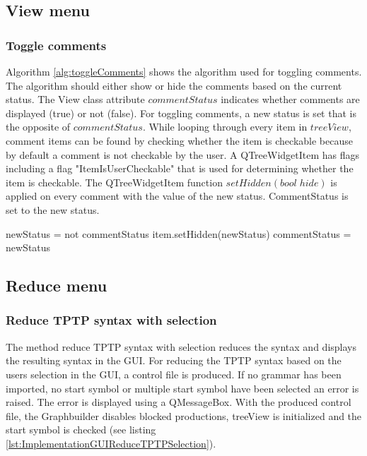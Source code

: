 \subsection{View menu}\label{sec:ImplementationGUIViewMenu}
\subsubsection{Toggle comments}\label{sec:ImplementationGUIToggleComments}

Algorithm \ref{alg:toggleComments} shows the algorithm used for toggling comments. The algorithm should either show or hide the comments based on the current status. 
The View class attribute $commentStatus$ indicates whether comments are displayed (true) or not (false). For toggling comments, a new status is set that is the opposite of $commentStatus$. While looping through every item in $treeView$, comment items can be found by checking whether the item is checkable because by default a comment is not checkable by the user. A QTreeWidgetItem has flags including a flag "ItemIsUserCheckable" that is used for determining whether the item is checkable. The QTreeWidgetItem function $setHidden(bool\;hide)$ is applied on every comment with the value of the new status. CommentStatus is set to the new status. 

\begin{algorithm}[H]
\caption{GUI Algorithm: toggle\textunderscore comments}
\label{alg:toggleComments}
\begin{algorithmic}[1] 
\State newStatus = not commentStatus
		\State item.setHidden(newStatus)
	\EndIf
\EndFor
\State commentStatus = newStatus
\end{algorithmic}
\end{algorithm}

\subsection{Reduce menu}\label{sec:ImplementationGUIReduceMenu}
\subsubsection{Reduce \ac{TPTP} syntax with selection}\label{sec:ImplementationGUIReduceWithSelection}

The method reduce \ac{TPTP} syntax with selection reduces the syntax and displays the resulting syntax in the GUI. 
For reducing the \ac{TPTP} syntax based on the users selection in the GUI, a control file is produced. If no grammar has been imported, no start symbol or multiple start symbol have been selected an error is raised. The error is displayed using a QMessageBox. With the produced control file, the Graphbuilder disables blocked productions, treeView is initialized and the start symbol is checked (see listing \ref{lst:ImplementationGUIReduceTPTPSelection}). 

